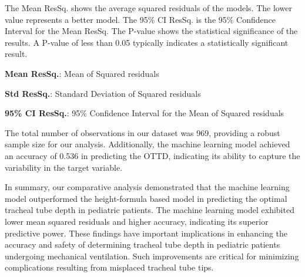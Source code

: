 \documentclass[11pt]{article}
\begin{document}
\begin{table}[h]
\caption{Comparison of predictive powers of Machine Learning Model and Formula-Based Model.}
\label{table:comparison_of_predictive_powers}
\begin{threeparttable}
\renewcommand{\TPTminimum}{\linewidth}
\begin{tablenotes}
\footnotesize
\item 
    The Mean ResSq. shows the average squared residuals of the models. 
    The lower value represents a better model. 
    The 95\% CI ResSq. is the 95\% Confidence Interval for the Mean ResSq.
    The P-value shows the statistical significance of the results. A P-value of less than 0.05 typically indicates a statistically significant result.
    
\item \textbf{Mean ResSq.}: Mean of Squared residuals
\item \textbf{Std ResSq.}: Standard Deviation of Squared residuals
\item \textbf{95\% CI ResSq.}: 95\% Confidence Interval for the Mean of Squared residuals
\end{tablenotes}
\end{threeparttable}
\end{table}


The total number of observations in our dataset was 969, providing a robust sample size for our analysis. Additionally, the machine learning model achieved an accuracy of 0.536 in predicting the OTTD, indicating its ability to capture the variability in the target variable.

In summary, our comparative analysis demonstrated that the machine learning model outperformed the height-formula based model in predicting the optimal tracheal tube depth in pediatric patients. The machine learning model exhibited lower mean squared residuals and higher accuracy, indicating its superior predictive power. These findings have important implications in enhancing the accuracy and safety of determining tracheal tube depth in pediatric patients undergoing mechanical ventilation. Such improvements are critical for minimizing complications resulting from misplaced tracheal tube tips.
\end{document}
